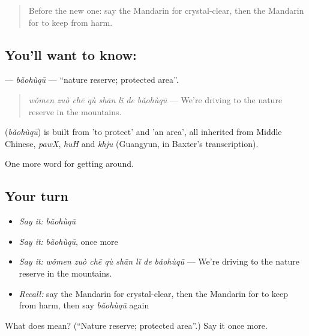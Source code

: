 \label{lesson:ZH-C443-baohuqu}



\begin{quote}
Before the new one: say the Mandarin for crystal-clear, then the Mandarin for to keep from harm.
\end{quote}

\subsection*{You'll want to know: }
\textbf{} — \emph{bǎohùqū} — \textquotedblleft{}nature reserve; protected area\textquotedblright{}.

\begin{quote}
\textbf{} \emph{wǒmen zuò chē qù shān lǐ de bǎohùqū} — We're driving to the nature reserve in the mountains.
\end{quote}

\begin{cousinweb}
\textbf{} (\emph{bǎohùqū}) is built from  'to protect' and  'an area', all inherited from Middle Chinese, \emph{pawX}, \emph{huH} and \emph{khju} (Guangyun, in Baxter's transcription).
\end{cousinweb}

\begin{grammarlens}[title={What you've built}]
One more word for getting around.
\end{grammarlens}

\subsection*{Your turn}
\begin{itemize}
\raggedright
  \item \emph{Say it:} \emph{bǎohùqū}
  \item \emph{Say it:} \emph{bǎohùqū}, once more
  \item \emph{Say it:} \emph{wǒmen zuò chē qù shān lǐ de bǎohùqū} — We're driving to the nature reserve in the mountains.
  \item \emph{Recall:} say the Mandarin for crystal-clear, then the Mandarin for to keep from harm, then say \emph{bǎohùqū} again
\end{itemize}

\begin{tcolorbox}[breakable,colback=teal!4,colframe=teal!35!black,title={Before you move on}]
What does  mean? (\textquotedblleft{}Nature reserve; protected area\textquotedblright{}.) Say it once more.
\end{tcolorbox}
